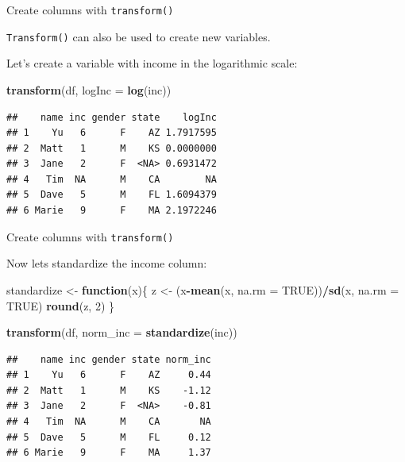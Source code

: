 \documentclass[ignorenonframetext,]{beamer}
\newenvironment{Shaded}{\begin{snugshade}}{\end{snugshade}}
\newcommand{\ControlFlowTok}[1]{\textcolor[rgb]{0.13,0.29,0.53}{\textbf{#1}}}
\newcommand{\DataTypeTok}[1]{\textcolor[rgb]{0.13,0.29,0.53}{#1}}
\newcommand{\DecValTok}[1]{\textcolor[rgb]{0.00,0.00,0.81}{#1}}
\newcommand{\KeywordTok}[1]{\textcolor[rgb]{0.13,0.29,0.53}{\textbf{#1}}}
\newcommand{\NormalTok}[1]{#1}
\newcommand{\OperatorTok}[1]{\textcolor[rgb]{0.81,0.36,0.00}{\textbf{#1}}}
\newcommand{\OtherTok}[1]{\textcolor[rgb]{0.56,0.35,0.01}{#1}}
\newcommand{\StringTok}[1]{\textcolor[rgb]{0.31,0.60,0.02}{#1}}
\begin{document}
\begin{frame}[fragile]{Create columns with \texttt{transform()}}
\protect\hypertarget{create-columns-with-transform}{}

\texttt{Transform()} can also be used to create new variables.

Let's create a variable with income in the logarithmic scale:

\begin{Shaded}
\begin{Highlighting}[]
\KeywordTok{transform}\NormalTok{(df, }\DataTypeTok{logInc =} \KeywordTok{log}\NormalTok{(inc))}
\end{Highlighting}
\end{Shaded}

\begin{verbatim}
##    name inc gender state    logInc
## 1    Yu   6      F    AZ 1.7917595
## 2  Matt   1      M    KS 0.0000000
## 3  Jane   2      F  <NA> 0.6931472
## 4   Tim  NA      M    CA        NA
## 5  Dave   5      M    FL 1.6094379
## 6 Marie   9      F    MA 2.1972246
\end{verbatim}

\end{frame}

\begin{frame}[fragile]{Create columns with \texttt{transform()}}
\protect\hypertarget{create-columns-with-transform-1}{}

Now lets standardize the income column:

\begin{Shaded}
\begin{Highlighting}[]
\NormalTok{standardize <-}\StringTok{ }\ControlFlowTok{function}\NormalTok{(x)\{}
\NormalTok{  z <-}\StringTok{ }\NormalTok{(x}\OperatorTok{-}\KeywordTok{mean}\NormalTok{(x, }\DataTypeTok{na.rm =} \OtherTok{TRUE}\NormalTok{))}\OperatorTok{/}\KeywordTok{sd}\NormalTok{(x, }\DataTypeTok{na.rm =} \OtherTok{TRUE}\NormalTok{)}
  \KeywordTok{round}\NormalTok{(z, }\DecValTok{2}\NormalTok{)}
\NormalTok{  \}}
\end{Highlighting}
\end{Shaded}

\begin{Shaded}
\begin{Highlighting}[]
\KeywordTok{transform}\NormalTok{(df, }\DataTypeTok{norm_inc =} \KeywordTok{standardize}\NormalTok{(inc))}
\end{Highlighting}
\end{Shaded}

\begin{verbatim}
##    name inc gender state norm_inc
## 1    Yu   6      F    AZ     0.44
## 2  Matt   1      M    KS    -1.12
## 3  Jane   2      F  <NA>    -0.81
## 4   Tim  NA      M    CA       NA
## 5  Dave   5      M    FL     0.12
## 6 Marie   9      F    MA     1.37
\end{verbatim}

\end{frame}
\end{document}
